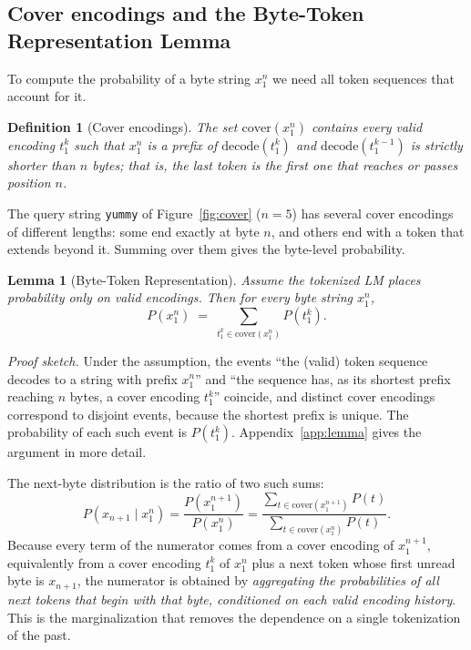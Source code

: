 \documentclass{article} %
\newtheorem{definition}{Definition}
\newtheorem{lemma}{Lemma}
\newcommand{\dec}{\mathrm{decode}}
\newcommand{\cover}{\mathrm{cover}}
\begin{document}
\subsection{Cover encodings and the Byte-Token Representation Lemma}
\label{sec:cover}
To compute the probability of a byte string $x_1^n$ we need all token sequences that account for it.

\begin{definition}[Cover encodings]\label{def:cover}
The set $\cover(x_1^n)$ contains every valid encoding $t_1^k$ such that $x_1^n$ is a prefix of $\dec(t_1^k)$ and $\dec(t_1^{k-1})$ is strictly shorter than $n$ bytes; that is, the last token is the first one that reaches or passes position $n$.
\end{definition}

The query string \texttt{yummy} of Figure~\ref{fig:cover} ($n=5$) has several cover encodings of different lengths: some end exactly at byte $n$, and others end with a token that extends beyond it. Summing over them gives the byte-level probability.

\begin{lemma}[Byte-Token Representation]\label{lem:btr}
Assume the tokenized LM places probability only on valid encodings. Then for every byte string $x_1^n$,
\begin{equation}
P(x_1^n) \;=\; \sum_{t_1^k\in \cover(x_1^n)} P(t_1^k).
\label{eq:lemma}
\end{equation}
\end{lemma}
\emph{Proof sketch.} Under the assumption, the events ``the (valid) token sequence decodes to a string with prefix $x_1^n$'' and ``the sequence has, as its shortest prefix reaching $n$ bytes, a cover encoding $t_1^k$'' coincide, and distinct cover encodings correspond to disjoint events, because the shortest prefix is unique. The probability of each such event is $P(t_1^k)$. Appendix~\ref{app:lemma} gives the argument in more detail.

The next-byte distribution is the ratio of two such sums:
\begin{equation}
P(x_{n+1}\mid x_1^n)=\frac{P(x_1^{n+1})}{P(x_1^n)}=\frac{\sum_{t\in\cover(x_1^{n+1})}P(t)}{\sum_{t\in\cover(x_1^{n})}P(t)}.
\label{eq:nextbyte}
\end{equation}
Because every term of the numerator comes from a cover encoding of $x_1^{n+1}$, equivalently from a cover encoding $t_1^k$ of $x_1^n$ plus a next token whose first unread byte is $x_{n+1}$, the numerator is obtained by \emph{aggregating the probabilities of all next tokens that begin with that byte, conditioned on each valid encoding history}. This is the marginalization that removes the dependence on a single tokenization of the past.
\end{document}
